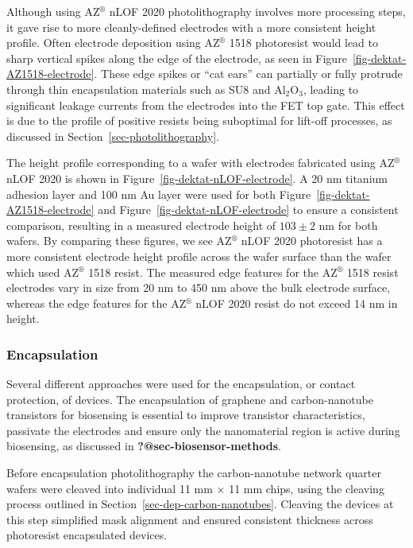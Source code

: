 \documentclass[
  letterpaper,
  DIV=11,
  numbers=noendperiod]{scrartcl}
\begin{document}
Although using AZ\(^\circledR\) nLOF 2020 photolithography involves more
processing steps, it gave rise to more cleanly-defined electrodes with a
more consistent height profile. Often electrode deposition using
AZ\(^\circledR\) 1518 photoresist would lead to sharp vertical spikes
along the edge of the electrode, as seen in
Figure~\ref{fig-dektat-AZ1518-electrode}. These edge spikes or ``cat
ears'' can partially or fully protrude through thin encapsulation
materials such as SU8 and Al\(_2\)O\(_3\), leading to significant
leakage currents from the electrodes into the FET top gate. This effect
is due to the profile of positive resists being suboptimal for lift-off
processes, as discussed in Section~\ref{sec-photolithography}.

The height profile corresponding to a wafer with electrodes fabricated
using AZ\(^\circledR\) nLOF 2020 is shown in
Figure~\ref{fig-dektat-nLOF-electrode}. A 20 nm titanium adhesion layer
and 100 nm Au layer were used for both
Figure~\ref{fig-dektat-AZ1518-electrode} and
Figure~\ref{fig-dektat-nLOF-electrode} to ensure a consistent
comparison, resulting in a measured electrode height of \(103\pm2\) nm
for both wafers. By comparing these figures, we see AZ\(^\circledR\)
nLOF 2020 photoresist has a more consistent electrode height profile
across the wafer surface than the wafer which used AZ\(^\circledR\) 1518
resist. The measured edge features for the AZ\(^\circledR\) 1518 resist
electrodes vary in size from 20 nm to 450 nm above the bulk electrode
surface, whereas the edge features for the AZ\(^\circledR\) nLOF 2020
resist do not exceed 14 nm in height.

\hypertarget{sec-encapsulation}{%
\subsubsection{Encapsulation}\label{sec-encapsulation}}

Several different approaches were used for the encapsulation, or contact
protection, of devices. The encapsulation of graphene and
carbon-nanotube transistors for biosensing is essential to improve
transistor characteristics, passivate the electrodes and ensure only the
nanomaterial region is active during biosensing, as discussed in
\textbf{?@sec-biosensor-methods}.

Before encapsulation photolithography the carbon-nanotube network
quarter wafers were cleaved into individual 11 mm \(\times\) 11 mm
chips, using the cleaving process outlined in
Section~\ref{sec-dep-carbon-nanotubes}. Cleaving the devices at this
step simplified mask alignment and ensured consistent thickness across
photoresist encapsulated devices.
\end{document}
